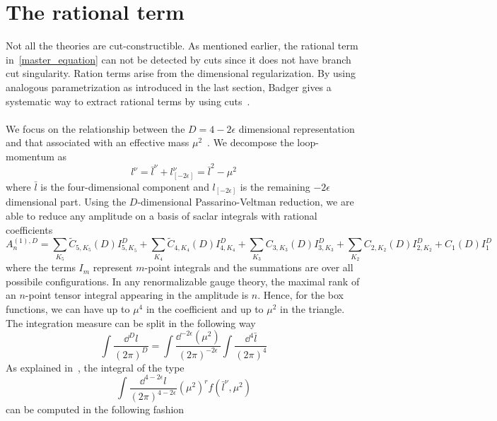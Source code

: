 \section{The rational term}\label{sect-rational}
Not all the theories are cut-constructible. 
As mentioned earlier, the rational term in~\cref{master_equation} can not be detected by cuts since it does not have branch cut singularity. 
Ration terms arise from the dimensional regularization.
By using analogous parametrization as introduced in the last section, 
Badger gives a systematic way to extract rational terms by using cuts~\cite{Badger:2008cm}.
\\\\
We focus on the relationship between the $D = 4-2\epsilon$ dimensional representation and that associated with an effective mass $\mu^2$~\cite{Mahlon:1993si}.
We decompose the loop-momentum as
\begin{equation*}
l^\nu = \bar{l}^\nu + l_{[-2\epsilon]}^\nu = \bar{l}^2 - \mu^2
\end{equation*}
where $\bar{l}$ is the four-dimensional component and $l_{[-2\epsilon]}$ is the remaining $-2\epsilon$ dimensional part.
Using the $D$-dimensional Passarino-Veltman reduction, we are able to reduce any amplitude on a basis of saclar integrals with rational coefficients
\begin{equation*}
A_n^{(1),D} = \sum_{K_5} \tilde{C}_{5,K_5}(D) I^D_{5,K_5}
+\sum_{K_4} \tilde{C}_{4,K_4}(D) I^D_{4,K_4}
+\sum_{K_3} C_{3,K_3}(D) I^D_{3,K_3}
+\sum_{K_2} C_{2,K_2}(D) I^D_{2,K_2}
+C_1(D)I_1^D
\end{equation*}
where the terms $I_m$ represent $m$-point integrals and the summations are over all possibile configurations.
In any renormalizable gauge theory, the maximal rank of an $n$-point tensor integral appearing in the amplitude is $n$.
Hence, for the box functions, we can have up to $\mu^4$ in the coefficient and up to $\mu^2$ in the triangle.
\\
The integration measure can be split in the following way
\begin{equation*}
\int\frac{\dd^D l}{(2\pi)^D} = 
\int\frac{\dd^{-2\epsilon}(\mu^2)}{(2\pi)^{-2\epsilon}}\int\frac{\dd^4 \bar{l}}{(2\pi)^4}
\end{equation*}
As explained in~\cite{Bern:1995db}, the integral of the type
\begin{equation*}
\int\frac{\dd^{4-2\epsilon} l}{(2\pi)^{4-2\epsilon}} (\mu^2)^rf(
\bar{l}^\nu,\mu^2) 
\end{equation*}
can be computed in the following fashion
